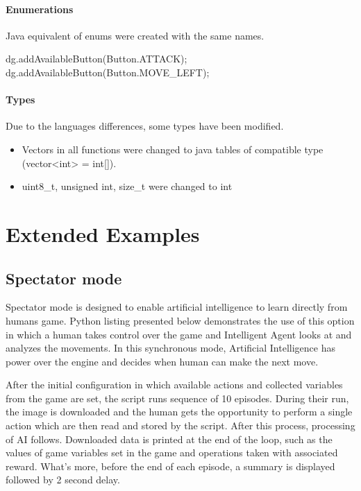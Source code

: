 \paragraph {Enumerations}
Java equivalent of enums were created with the same names.
\begin{cblock}
dg.addAvailableButton(Button.ATTACK);
dg.addAvailableButton(Button.MOVE_LEFT);
\end{cblock}
\paragraph {Types}
Due to the languages differences, some types have been modified.
\begin{itemize}
\item Vectors in all functions were changed to java tables of compatible type (vector<int> = int[]).
\item uint8\_t, unsigned int, size\_t were changed to int
\end{itemize}
\section{Extended Examples}
\subsection{Spectator mode}
Spectator mode is designed to enable artificial intelligence to learn directly from humans game.
Python listing presented below demonstrates the use of this option in which a human takes control over the game and Intelligent Agent looks at and analyzes the movements. In this synchronous mode, Artificial Intelligence has power over the engine and decides when human can make the next move. 


After the initial configuration in which available actions and collected variables from the game are set, the script runs sequence of 10 episodes. During their run, the image is downloaded and the human gets the opportunity to perform a single action which are then read and stored by the script. After this process, processing of AI follows. Downloaded data is printed at the end of the loop, such as the values of game variables set in the game and operations taken with associated reward. What's more, before the end of each episode, a summary is displayed followed by 2 second delay.

